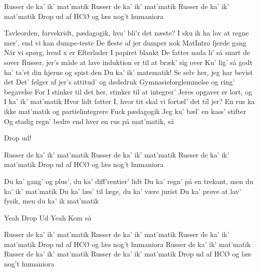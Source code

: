 \documentclass[a4paper,11pt]{article}
\begin{document}
\begin{song}
 Russer de ka' ik' mat'matik
Russer de ka' ik' mat'matik
Russer de ka' ik' mat'matik
Drop ud af HCØ og læs nog't humaniora

 Tavleorden, farvekridt, pædagogik, hva' bli'r det næste?
I sku ik ha lov at regne mer', end vi kan dumpe-teste
 De fleste af jer dumper nok MatIntro fjerde gang
 Når vi spørg, hvad x er
 Efterlader I papiret blankt
De fatter nada li' så snart de sover
 Russer, jer's måde at lave induktion er til at bræk' sig over
 Ku' lig' så godt ha' ta'et din hjerne og spist den
 Du ka' ik' matematik! Se selv her, jeg har bevist det
 Det' følger af jer's attitud' og dødsdruk
Gymnasieforglemmelse og ring' begavelse
 For I stinker til det her, stinker til at integrer'
 Jeres opgaver er lort, og I ka' ik' mat'matik
Hvor lidt fatter I, hvor tit skal vi fortæl' det til jer?
En rus ka ikke mat'matik og partielintegrere
 Fuck pædagogik
Jeg ku' bæl' en kass' stifter
 Og stadig regn' bedre end hver en rus på mat'matik, så

 Drop ud!

 Russer de ka' ik' mat'matik
Russer de ka' ik' mat'matik
Russer de ka' ik' mat'matik
Drop ud af HCØ og læs nog't humaniora

 Du ka' gang' og plus', du ka' diff'rentier' lidt
Du ka' regn' på en trekant, men du ka' ik' mat'matik
Du ka' læs' til læge, du ka' være jurist
Du ka' prøve at lav' fysik, men du ka' ik mat'matik

 Yeah
Drop Ud
Yeah
Kom så

 Russer de ka' ik' mat'matik
Russer de ka' ik' mat'matik
Russer de ka' ik' mat'matik
Drop ud af HCØ og læs nog't humaniora
Russer de ka' ik' mat'matik
Russer de ka' ik' mat'matik
Russer de ka' ik' mat'matik
Drop ud af HCØ og læs nog't humaniora




\end{song}
\end{document}
